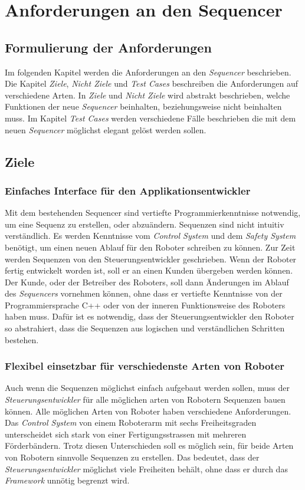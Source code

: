 \chapter{Anforderungen an den Sequencer}
\section{Formulierung der Anforderungen}
Im folgenden Kapitel werden die Anforderungen an den \textit{Sequencer} beschrieben.
Die Kapitel \textit{Ziele}, \textit{Nicht Ziele} und \textit{Test Cases} beschreiben die Anforderungen auf verschiedene Arten.
In \textit{Ziele} und \textit{Nicht Ziele} wird abstrakt beschrieben, welche Funktionen der neue \textit{Sequencer} beinhalten, beziehungsweise nicht beinhalten muss.
Im Kapitel \textit{Test Cases} werden verschiedene Fälle beschrieben die mit dem neuen \textit{Sequencer} möglichst elegant gelöst werden sollen.



\section{Ziele}
\subsection{Einfaches Interface für den Applikationsentwickler}
Mit dem bestehenden Sequencer sind vertiefte Programmierkenntnisse notwendig, um eine Sequenz zu erstellen, oder abzuändern.
Sequenzen sind nicht intuitiv verständlich.
Es werden Kenntnisse vom \textit{Control System} und dem \textit{Safety System} benötigt, um einen neuen Ablauf für den Roboter schreiben zu können. %
Zur Zeit werden Sequenzen von den Steuerungsentwickler geschrieben.
Wenn der Roboter fertig entwickelt worden ist, soll er an einen Kunden übergeben werden können.
Der Kunde, oder der Betreiber des Roboters, soll dann Änderungen im Ablauf des \textit{Sequencers} vornehmen können, ohne dass er vertiefte Kenntnisse von der Programmiersprache C++ oder von der inneren Funktionsweise des Roboters haben muss.
Dafür ist es notwendig, dass der Steuerungsentwickler den Roboter so abstrahiert, dass die Sequenzen aus logischen und verständlichen Schritten bestehen.


\subsection{Flexibel einsetzbar für verschiedenste Arten von Roboter}
Auch wenn die Sequenzen möglichst einfach aufgebaut werden sollen, muss der \textit{Steuerungsentwickler} für alle möglichen arten von Robotern Sequenzen bauen können.
Alle möglichen Arten von Roboter haben verschiedene Anforderungen.
Das \textit{Control System} von einem Roboterarm mit sechs Freiheitsgraden unterscheidet sich stark von einer Fertigungsstrassen mit mehreren Förderbändern.
Trotz diesen Unterschieden soll es möglich sein, für beide Arten von Robotern sinnvolle Sequenzen zu erstellen.
Das bedeutet, dass der \textit{Steuerungsentwickler} möglichst viele Freiheiten behält, ohne dass er durch das \textit{Framework} unnötig begrenzt wird.


